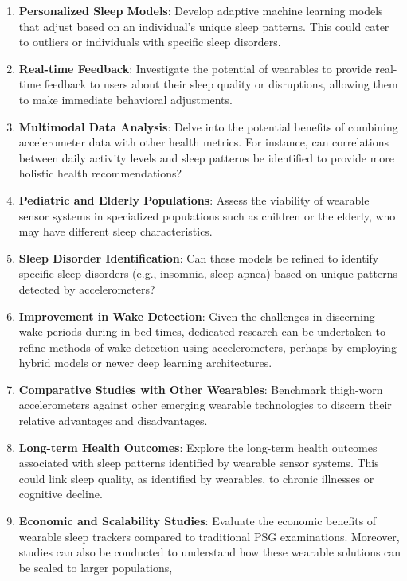 \documentclass[
  10pt,
]{scrbook}
\let\originaltextbf\textbf
\renewcommand{\textbf}[1]{\textcolor{color1}{\originaltextbf{#1}}}
\begin{document}
\begin{enumerate}
\def\labelenumi{\arabic{enumi}.}
\item
  \textbf{Personalized Sleep Models}: Develop adaptive machine learning
  models that adjust based on an individual's unique sleep patterns.
  This could cater to outliers or individuals with specific sleep
  disorders.
\item
  \textbf{Real-time Feedback}: Investigate the potential of wearables to
  provide real-time feedback to users about their sleep quality or
  disruptions, allowing them to make immediate behavioral adjustments.
\item
  \textbf{Multimodal Data Analysis}: Delve into the potential benefits
  of combining accelerometer data with other health metrics. For
  instance, can correlations between daily activity levels and sleep
  patterns be identified to provide more holistic health
  recommendations?
\item
  \textbf{Pediatric and Elderly Populations}: Assess the viability of
  wearable sensor systems in specialized populations such as children or
  the elderly, who may have different sleep characteristics.
\item
  \textbf{Sleep Disorder Identification}: Can these models be refined to
  identify specific sleep disorders (e.g., insomnia, sleep apnea) based
  on unique patterns detected by accelerometers?
\item
  \textbf{Improvement in Wake Detection}: Given the challenges in
  discerning wake periods during in-bed times, dedicated research can be
  undertaken to refine methods of wake detection using accelerometers,
  perhaps by employing hybrid models or newer deep learning
  architectures.
\item
  \textbf{Comparative Studies with Other Wearables}: Benchmark
  thigh-worn accelerometers against other emerging wearable technologies
  to discern their relative advantages and disadvantages.
\item
  \textbf{Long-term Health Outcomes}: Explore the long-term health
  outcomes associated with sleep patterns identified by wearable sensor
  systems. This could link sleep quality, as identified by wearables, to
  chronic illnesses or cognitive decline.
\item
  \textbf{Economic and Scalability Studies}: Evaluate the economic
  benefits of wearable sleep trackers compared to traditional PSG
  examinations. Moreover, studies can also be conducted to understand
  how these wearable solutions can be scaled to larger populations,

\end{enumerate}
\end{document}

